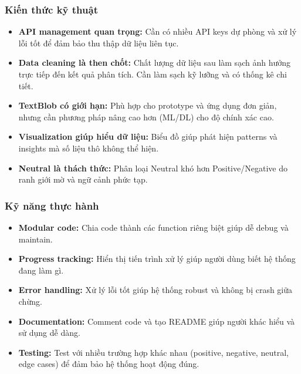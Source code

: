 \subsubsection{Kiến thức kỹ thuật}
\begin{itemize}
    \item \textbf{API management quan trọng:} Cần có nhiều API keys dự phòng và xử lý lỗi tốt để đảm bảo thu thập dữ liệu liên tục.
    
    \item \textbf{Data cleaning là then chốt:} Chất lượng dữ liệu sau làm sạch ảnh hưởng trực tiếp đến kết quả phân tích. Cần làm sạch kỹ lưỡng và có thống kê chi tiết.
    
    \item \textbf{TextBlob có giới hạn:} Phù hợp cho prototype và ứng dụng đơn giản, nhưng cần phương pháp nâng cao hơn (ML/DL) cho độ chính xác cao.
    
    \item \textbf{Visualization giúp hiểu dữ liệu:} Biểu đồ giúp phát hiện patterns và insights mà số liệu thô không thể hiện.
    
    \item \textbf{Neutral là thách thức:} Phân loại Neutral khó hơn Positive/Negative do ranh giới mờ và ngữ cảnh phức tạp.
\end{itemize}

\subsubsection{Kỹ năng thực hành}
\begin{itemize}
    \item \textbf{Modular code:} Chia code thành các function riêng biệt giúp dễ debug và maintain.
    
    \item \textbf{Progress tracking:} Hiển thị tiến trình xử lý giúp người dùng biết hệ thống đang làm gì.
    
    \item \textbf{Error handling:} Xử lý lỗi tốt giúp hệ thống robust và không bị crash giữa chừng.
    
    \item \textbf{Documentation:} Comment code và tạo README giúp người khác hiểu và sử dụng dễ dàng.
    
    \item \textbf{Testing:} Test với nhiều trường hợp khác nhau (positive, negative, neutral, edge cases) để đảm bảo hệ thống hoạt động đúng.
\end{itemize}

